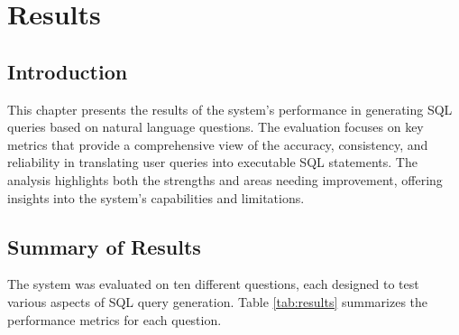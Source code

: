 
%

\chapter{Results}
\label{cha:results}

\section{Introduction}

This chapter presents the results of the system's performance in generating SQL queries based on natural language questions. The evaluation focuses on key metrics that provide a comprehensive view of the accuracy, consistency, and reliability in translating user queries into executable SQL statements. The analysis highlights both the strengths and areas needing improvement, offering insights into the system's capabilities and limitations.

\section{Summary of Results}

The system was evaluated on ten different questions, each designed to test various aspects of SQL query generation. Table \ref{tab:results} summarizes the performance metrics for each question.

